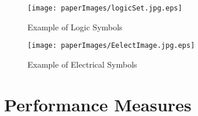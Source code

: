 \begin{figure}[]\centering

		\texttt{[image: paperImages/logicSet.jpg.eps]}	

	\caption[Symbols in LD-DB]{Example of Logic Symbols}
	\label{fig:LogicSet}
\end{figure}
\begin{figure}[]\centering

		\texttt{[image: paperImages/EelectImage.jpg.eps]}	

	\caption[Symbols in EL-DB]{Example of Electrical Symbols}
	\label{fig:ElectSet}
\end{figure}
\begin{table}
\begin{center}
\caption[Datasets Comparisons]{Datasets Comparisons} 
\label{tab:datasets}

\end{center}
\end{table}


\section{Performance Measures }
\label{sec:PerformanceMeasures}

